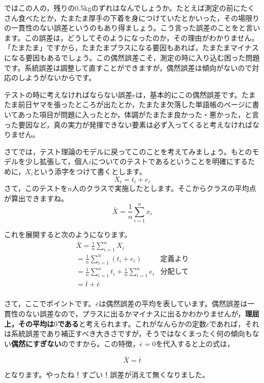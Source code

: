 \documentclass{ltjbook}
\begin{document}
ではこの人の，残りの0.5kgのずれはなんでしょうか。たとえば測定の前にたくさん食べたとか，たまたま厚手の下着を身につけていたとかいった，その場限りの一貫性のない誤差というのもあり得ましょう。こう言った誤差のことをと言います。この誤差は，どうしてそのようになったのか，その理由がわかりません。「たまたま」ですから，たまたまプラスになる要因もあれば，たまたまマイナスになる要因もあるでしょう。この偶然誤差こそ，測定の時に入り込む困った問題です。系統誤差は調整して直すことができますが，偶然誤差は傾向がないので対応のしようがないからです。

テストの時に考えなければならない誤差$e$は，基本的にこの偶然誤差です。たまたま前日ヤマを張ったところが出たとか，たまたま欠落した単語帳のページに書いてあった項目が問題に入ったとか，体調がたまたま良かった・悪かった，と言った要因など，真の実力が発揮できない要素は必ず入ってくると考えなければなりません。

さてでは，テスト理論のモデルに戻ってこのことを考えてみましょう。もとのモデルを少し拡張して，個人$i$についてのテストであるということを明確にするために，$X_i$という添字をつけて書くとします。
\[ X_i = t_i + e_i \]
さて，このテストを$n$人のクラスで実施したとします。そこからクラスの平均点が算出できますね。
\[ \bar{X} = \frac{1}{n}\sum_{i=1}^n x_i \]

これを展開すると次のようになります。
\begin{align*}
	 & \bar{X}  =  \frac{1}{n}\sum_{i=1}^n X_i                         &             & \mbox{} \\
	 & =  \frac{1}{n}\sum_{i=1}^n (t_i + e_i)                          & \mbox{定義より}           \\
	 & =  \frac{1}{n} \sum_{i=1}^n  t_i + \frac{1}{n}\sum_{i=1}^n  e_i & \mbox{分配して}           \\
	 & =  \bar{t} + \bar{e}                                            & \mbox{}               \\
\end{align*}

さて，ここでポイントです。$\bar{e}$は偶然誤差の平均を表しています。偶然誤差は一貫性のない誤差なので，プラスに出るかマイナスに出るかわかりませんが，\textbf{理屈上，その平均は$0$である}と考えられます。これがなんらかの定数$c$であれば，それは系統誤差であり補正すべき大きさですが，そうではなくまったく何の傾向もない\textbf{偶然にすぎない}のですから。この特徴，$\bar{e}=0$を代入すると上の式は，

\[ \bar{X} = \bar{t} \]

となります。やったね！すごい！誤差が消えて無くなりました。
\end{document}
